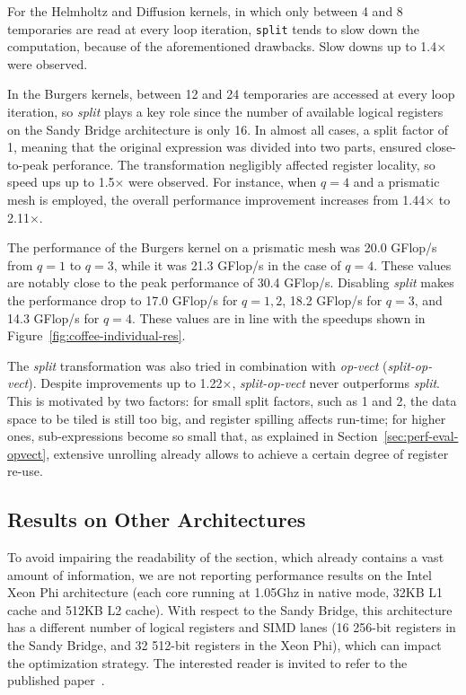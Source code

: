 For the Helmholtz and Diffusion kernels, in which only between 4 and 8 temporaries are read at every loop iteration, \texttt{split} tends to slow down the computation, because of the aforementioned drawbacks. Slow downs up to 1.4$\times$ were observed. 

In the Burgers kernels, between 12 and 24 temporaries are accessed at every loop iteration, so \emph{split} plays a key role since the number of available logical registers on the Sandy Bridge architecture is only 16. In almost all cases, a split factor of 1, meaning that the original expression was divided into two parts, ensured close-to-peak perforance. The transformation negligibly affected register locality, so speed ups up to 1.5$\times$ were observed. For instance, when $q=4$ and a prismatic mesh is employed, the overall performance improvement increases from 1.44$\times$ to 2.11$\times$. 

The performance of the Burgers kernel on a prismatic mesh was 20.0 GFlop/s from $q=1$ to $q=3$, while it was 21.3 GFlop/s in the case of $q=4$. These values are notably close to the peak performance of 30.4 GFlop/s. Disabling \emph{split} makes the performance drop to 17.0 GFlop/s for $q=1, 2$, 18.2 GFlop/s for $q=3$,
and 14.3 GFlop/s for $q=4$. These values are in line with the speedups shown in Figure~\ref{fig:coffee-individual-res}.

The \emph{split} transformation was also tried in combination with \emph{op-vect} (\emph{split-op-vect}). Despite improvements up to 1.22$\times$, \emph{split-op-vect} never outperforms \emph{split}. This is motivated by two factors: for small split factors, such as 1 and 2, the data space to be tiled is still too big, and register spilling affects run-time; for higher ones, sub-expressions become so small that, as explained in Section~\ref{sec:perf-eval-opvect}, extensive unrolling already allows to achieve a certain degree of register re-use.

\subsection*{Results on Other Architectures}
To avoid impairing the readability of the section, which already contains a vast amount of information, we are not reporting performance results on the Intel Xeon Phi  architecture (each core running at 1.05Ghz in native mode, 32KB L1 cache and 512KB L2 cache). With respect to the Sandy Bridge, this architecture has a different number of logical registers and SIMD lanes (16 256-bit registers in the Sandy Bridge, and 32 512-bit registers in the Xeon Phi), which can impact the optimization strategy. The interested reader is invited to refer to the published paper~\citep{Luporini-coffee}.


